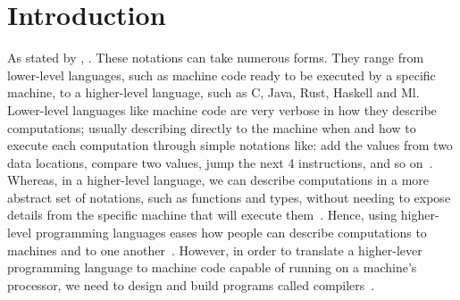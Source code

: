 \documentclass[
  oneside,
  english,
  coorientadorbanca,
  noabntexcite
]{ufsc-thesis-rn46-2019}
\begin{document}

\tableofcontents*

\textual{}

\chapter{Introduction}\label{chapter:introduction}

As stated by \textcite{Aho:2006:CPT:1177220}, .
These notations can take numerous forms.
They range from lower-level languages, such as machine code ready to be executed by a specific machine, to a higher-level language, such as C, Java, Rust, Haskell and Ml.
Lower-level languages like machine code are very verbose in how they describe computations; usually describing directly to the machine when and how to execute each computation through simple notations like: add the values from two data locations, compare two values, jump the next 4 instructions, and so on~\cite{Aho:2006:CPT:1177220}.
Whereas, in a higher-level language, we can describe computations in a more abstract set of notations, such as functions and types, without needing to expose details from the specific machine that will execute them~\cite{Aho:2006:CPT:1177220}.
Hence, using higher-level programming languages eases how people can describe computations to machines and to one another~\cite{Aho:2006:CPT:1177220}.
However, in order to translate a higher-lever programming language to machine code capable of running on a machine's processor, we need to design and build programs called compilers~\cite{Aho:2006:CPT:1177220}.
\end{document}
